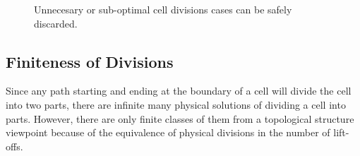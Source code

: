 \documentclass[journal]{IEEEtran}
\begin{document}
\begin{figure}[t]
\centering
{}
\caption{Unnecesary or sub-optimal cell divisions cases can be safely discarded.}
\label{figproof}
\end{figure}

\subsection{Finiteness of Divisions}
\label{subsectionproof}
Since any path starting and ending at the boundary of a cell will divide the cell into two parts, there are infinite many physical solutions of dividing a cell into parts. However, there are only finite classes of them from a topological structure viewpoint 
because of the equivalence of physical divisions in the number of lift-offs. 
\end{document}
